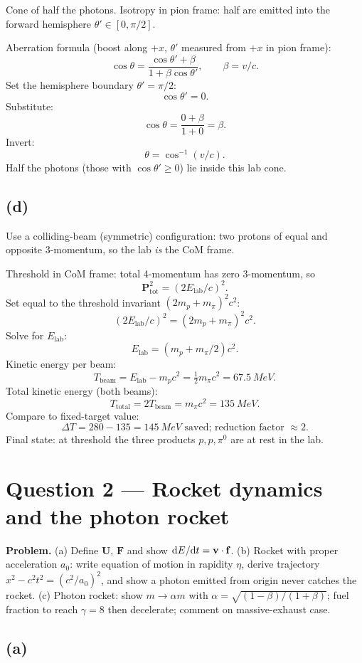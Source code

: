 \documentclass[11pt]{article}
\newcommand{\de}{\mathrm{d}}
\begin{document}
Cone of half the photons. Isotropy in pion frame: half are emitted into the forward hemisphere $\theta'\in[0,\pi/2]$.

Aberration formula (boost along $+x$, $\theta'$ measured from $+x$ in pion frame):
\[ \cos\theta = \frac{\cos\theta'+\beta}{1+\beta\cos\theta'},\qquad \beta=v/c. \]
Set the hemisphere boundary $\theta'=\pi/2$:
\[ \cos\theta'=0. \]
Substitute:
\[ \cos\theta = \frac{0+\beta}{1+0} = \beta. \]
Invert:
\[ \boxed{\;\theta = \cos^{-1}(v/c).\;} \]
Half the photons (those with $\cos\theta'\ge 0$) lie inside this lab cone.

\subsection*{(d)}

Use a colliding-beam (symmetric) configuration: two protons of equal and opposite 3-momentum, so the lab \emph{is} the CoM frame.

Threshold in CoM frame: total 4-momentum has zero 3-momentum, so
\[ \bm P_\text{tot}^2 = (2E_\text{lab}/c)^2. \]
Set equal to the threshold invariant $(2m_p+m_\pi)^2 c^2$:
\[ (2E_\text{lab}/c)^2 = (2m_p+m_\pi)^2 c^2. \]
Solve for $E_\text{lab}$:
\[ E_\text{lab} = (m_p + m_\pi/2)c^2. \]
Kinetic energy per beam:
\[ T_\text{beam} = E_\text{lab} - m_p c^2 = \tfrac{1}{2}m_\pi c^2 = \SI{67.5}{MeV}. \]
Total kinetic energy (both beams):
\[ T_\text{total} = 2T_\text{beam} = m_\pi c^2 = \SI{135}{MeV}. \]
Compare to fixed-target value:
\[ \boxed{\;\Delta T = 280-135 = \SI{145}{MeV}\text{ saved; reduction factor }\approx 2.\;} \]
Final state: at threshold the three products $p,p,\pi^0$ are at rest in the lab.

\section*{Question 2 --- Rocket dynamics and the photon rocket}

\textbf{Problem.} (a) Define $\bm U$, $\bm F$ and show $\de E/\de t = \vb v\cdot\vb f$. (b) Rocket with proper acceleration $a_0$: write equation of motion in rapidity $\eta$, derive trajectory $x^2-c^2t^2=(c^2/a_0)^2$, and show a photon emitted from origin never catches the rocket. (c) Photon rocket: show $m\to\alpha m$ with $\alpha=\sqrt{(1-\beta)/(1+\beta)}$; fuel fraction to reach $\gamma=8$ then decelerate; comment on massive-exhaust case.

\subsection*{(a)}
\end{document}
